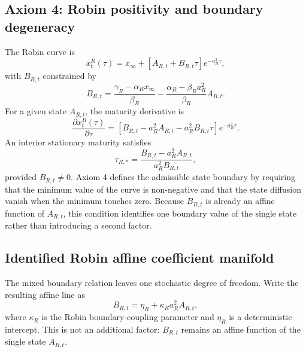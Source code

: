 \documentclass[12pt]{article}
\numberwithin{equation}{subsection}
\begin{document}
\subsection{Axiom 4: Robin positivity and boundary degeneracy}

The Robin curve is
\begin{equation}
x^R_t(\tau)
=
x_\infty+
\left[A_{R,t}+B_{R,t}\tau\right]e^{-a_R^2\tau},
\end{equation}
with $B_{R,t}$ constrained by
\begin{equation}
B_{R,t}
=
\frac{\gamma_R-\alpha_Rx_\infty}{\beta_R}
-
\frac{\alpha_R-\beta_Ra_R^2}{\beta_R}A_{R,t}.
\end{equation}
For a given state $A_{R,t}$, the maturity derivative is
\begin{equation}
\frac{\partial x^R_t(\tau)}{\partial\tau}
=
\left[
B_{R,t}-a_R^2A_{R,t}-a_R^2B_{R,t}\tau
\right]e^{-a_R^2\tau}.
\end{equation}
An interior stationary maturity satisfies
\begin{equation}
\tau_{R,*}
=
\frac{B_{R,t}-a_R^2A_{R,t}}{a_R^2B_{R,t}},
\end{equation}
provided $B_{R,t}\ne0$. Axiom 4 defines the admissible state boundary by requiring that the minimum value of the curve is non-negative and that the state diffusion vanish when the minimum touches zero. Because $B_{R,t}$ is already an affine function of $A_{R,t}$, this condition identifies one boundary value of the single state rather than introducing a second factor.

\subsection{Identified Robin affine coefficient manifold}

The mixed boundary relation leaves one stochastic degree of freedom. Write the resulting affine line as
\begin{equation}
B_{R,t}=\eta_R+\kappa_Ra_R^2A_{R,t},
\end{equation}
where $\kappa_R$ is the Robin boundary-coupling parameter and $\eta_R$ is a deterministic intercept. This is not an additional factor: $B_{R,t}$ remains an affine function of the single state $A_{R,t}$.
\end{document}
